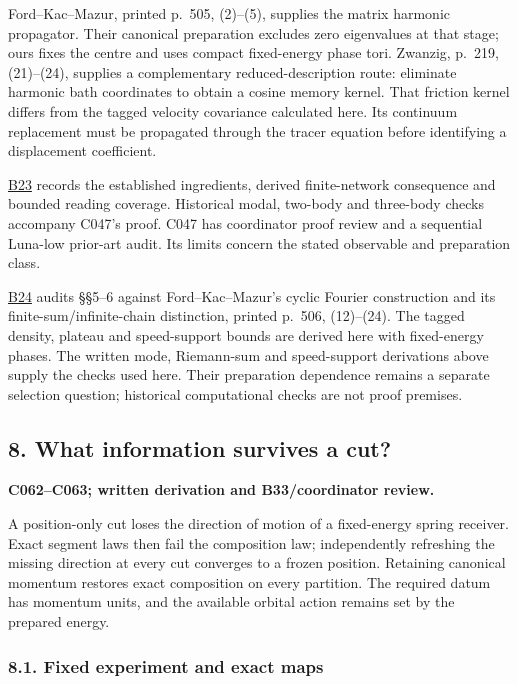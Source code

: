 \documentclass[11pt,a4paper]{article}
\begin{document}
Ford--Kac--Mazur, printed p.~505, (2)--(5), supplies the matrix harmonic
propagator. Their canonical preparation excludes zero eigenvalues at
that stage; ours fixes the centre and uses compact fixed-energy phase
tori. Zwanzig, p.~219, (21)--(24), supplies a complementary
reduced-description route: eliminate harmonic bath coordinates to obtain
a cosine memory kernel. That friction kernel differs from the tagged
velocity covariance calculated here. Its continuum replacement must be
propagated through the tracer equation before identifying a displacement
coefficient.

\href{../references/batches/B23.md}{B23} records the established
ingredients, derived finite-network consequence and bounded reading
coverage. Historical modal, two-body and three-body checks accompany
C047's proof. C047 has coordinator proof review and a sequential
Luna-low prior-art audit. Its limits concern the stated observable and
preparation class.

\href{../references/batches/B24.md}{B24} audits §§5--6 against
Ford--Kac--Mazur's cyclic Fourier construction and its
finite-sum/infinite-chain distinction, printed p.~506, (12)--(24). The
tagged density, plateau and speed-support bounds are derived here with
fixed-energy phases. The written mode, Riemann-sum and speed-support
derivations above supply the checks used here. Their preparation
dependence remains a separate selection question; historical
computational checks are not proof premises.

\hypertarget{what-information-survives-a-cut}{%
\subsection{8. What information survives a
cut?}\label{what-information-survives-a-cut}}

\textbf{C062--C063; written derivation and B33/coordinator review.}

A position-only cut loses the direction of motion of a fixed-energy
spring receiver. Exact segment laws then fail the composition law;
independently refreshing the missing direction at every cut converges to
a frozen position. Retaining canonical momentum restores exact
composition on every partition. The required datum has momentum units,
and the available orbital action remains set by the prepared energy.

\hypertarget{fixed-experiment-and-exact-maps}{%
\subsubsection{8.1. Fixed experiment and exact
maps}\label{fixed-experiment-and-exact-maps}}
\end{document}
